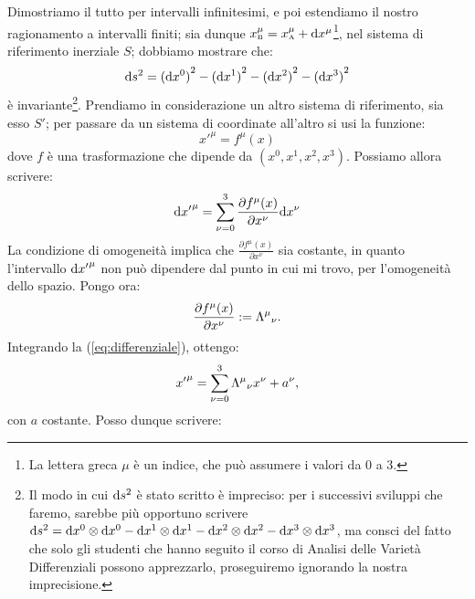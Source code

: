 \begin{dimostrazione}Dimostriamo il tutto per intervalli infinitesimi,
  e poi estendiamo il nostro ragionamento a intervalli finiti; sia
  dunque $x_{\mathrm{\scriptscriptstyle B}}^{\mu} =
  x_{\mathrm{\scriptscriptstyle A}}^{\mu} + \mathrm{d} x^{ \mu }$\footnote{La
    lettera greca $\mu$ \`e un indice, che pu\`o assumere i valori da
    0 a 3.}, nel sistema di riferimento inerziale $S$; dobbiamo
  mostrare che:
  \begin{displaymath}
    \mathrm{d} s^2 = {(\mathrm{d} x^0)}^2 - {(\mathrm{d} x^1)}^2 - {(\mathrm{d} x^2)}^2 - {(\mathrm{d}
      x^3)}^2
  \end{displaymath}
  \`e invariante\footnote{Il modo in cui $\mathrm{d} s^2$ \`e stato scritto
    \`e impreciso: per i successivi sviluppi che faremo, sarebbe pi\`u
    opportuno scrivere $\mathrm{d} s^2 = \mathrm{d} x^0 \otimes \mathrm{d} x^0 - \mathrm{d} x^1
    \otimes \mathrm{d} x^1 - \mathrm{d} x^2 \otimes \mathrm{d} x^2 - \mathrm{d} x^3 \otimes \mathrm{d}
    x^3$, ma consci del fatto che solo gli studenti che hanno seguito
    il corso di Analisi delle Variet\`a Differenziali possono
    apprezzarlo, proseguiremo ignorando la nostra
    imprecisione.}. Prendiamo in considerazione un altro sistema di
  riferimento, sia esso $S'$; per passare da un sistema di coordinate
  all'altro si usi la funzione:
  \begin{displaymath}
    {x'}^{\mu} = f^{ \mu }( x )
  \end{displaymath}
  dove $f$ \`e una trasformazione che dipende da $\left( x^0 , x^1 ,
    x^2 , x^3 \right)$. Possiamo allora scrivere:
  \begin{equation}
    \mathrm{d} {x'}^{ \mu } = \sum_{\nu =0 }^{ 3 } \frac{ \partial f^{ \mu }(
      x ) }{ \partial x^{\nu} } \mathrm{d} x^{\nu} \label{eq:differenziale}
  \end{equation}
  La condizione di omogeneit\`a implica che $ \frac{ \partial f^{ \mu
    }( x ) }{ \partial x^{\nu} } $ sia costante, in quanto
  l'intervallo $\mathrm{d} {x'}^{ \mu}$ non pu\`o dipendere dal punto in cui
  mi trovo, per l'omogeneit\`a dello spazio. Pongo ora:
  \begin{displaymath}
    \frac{\partial f^{ \mu }( x ) }{ \partial x^{\nu} } := \Lambda^{ \mu} {}_{ \nu }.
  \end{displaymath}
  Integrando la (\ref{eq:differenziale}), ottengo:
  \begin{displaymath}
    {x'}^{ \mu} = \sum_{ \nu = 0}^{ 3 } \Lambda^{ \mu } {}_{ \nu } x^{\nu}
    + a^{ \nu },
  \end{displaymath}
  con $ a $ costante. Posso dunque scrivere:
  \begin{displaymath}

\end{displaymath}
\end{dimostrazione}
